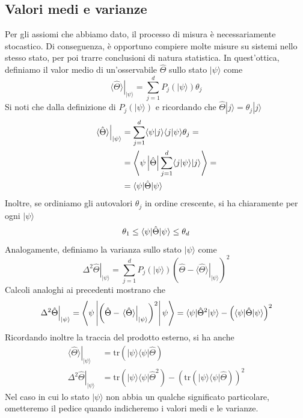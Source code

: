 \documentclass[a4paper, 11pt]{article}
\newcommand{\tr}{\mathrm{tr}}
\renewcommand{\ket}[1]{| #1\rangle}
\renewcommand{\bra}[1]{\langle #1|}
\begin{document}
\subsection{Valori medi e varianze}
Per gli assiomi che abbiamo dato, il processo di misura è necessariamente stocastico. Di conseguenza, è opportuno compiere molte misure su sistemi nello stesso stato, per poi trarre conclusioni di natura statistica. In quest'ottica, definiamo il valor medio di un'osservabile $\hat{\Theta}$ sullo stato $\ket{\psi}$ come
\[\left.\langle\hat{\Theta}\rangle\right|_{\ket{\psi}}=\sum_{j=1}^{d}P_j(\ket{\psi})\theta_j\]
Si noti che dalla definizione di $P_j(\ket{\psi})$ e ricordando che $\hat{\Theta}\ket{j}=\theta_j\ket{j}$
\begin{align*}
	\left.\langle\hat{\Theta}\rangle\right|_{\ket{\psi}}&=\sum_{j=1}^{d}\braket{\psi}{j}\braket{j}{\psi}\theta_j=\\&=\Bigbraketop{\psi}{\hat{\Theta}}{\sum_{j=1}^{d}\braket{j}{\psi}\ket{j}}=\\&=\braketop{\psi}{\hat{\Theta}}{\psi}
\end{align*}
Inoltre, se ordiniamo gli autovalori $\theta_j$ in ordine crescente, si ha chiaramente per ogni $\ket{\psi}$
\[\theta_1\leq\langle\psi|\hat{\Theta}|\psi\rangle\leq\theta_d\]
Analogamente, definiamo la varianza sullo stato $\ket{\psi}$ come
\[\left.\Delta^2\hat{\Theta}\right|_{\ket{\psi}}=\sum_{j=1}^{d}P_j(\ket{\psi})\left(\hat{\Theta}-\left.\langle\hat{\Theta}\rangle\right|_{\ket{\psi}}\right)^2\]
Calcoli analoghi ai precedenti mostrano che
\[\left.\Delta^2\hat{\Theta}\right|_{\ket{\psi}}=\Bigbraketop{\psi}{\left(\hat{\Theta}-\left.\langle\hat{\Theta}\rangle\right|_{\ket{\psi}}\right)^2}{\psi}=\braketop{\psi}{\hat{\Theta}^2}{\psi}-\left(\braketop{\psi}{\hat{\Theta
}}{\psi}\right)^2\]
Ricordando inoltre la traccia del prodotto esterno, si ha anche
\begin{align*}
	\left.\langle\hat{\Theta}\rangle\right|_{\ket{\psi}}&=\tr\left(\ket{\psi}\bra{\psi}\hat{\Theta}\right)\\\left.\Delta^2\hat{\Theta}\right|_{\ket{\psi}}&=\tr\left(\ket{\psi}\bra{\psi}\hat{\Theta}^2\right)-\left(\tr\left(\ket{\psi}\bra{\psi}\hat{\Theta}\right)\right)^2
\end{align*}
Nel caso in cui lo stato $\ket{\psi}$ non abbia un qualche significato particolare, ometteremo il pedice quando indicheremo i valori medi e le varianze.
\end{document}
